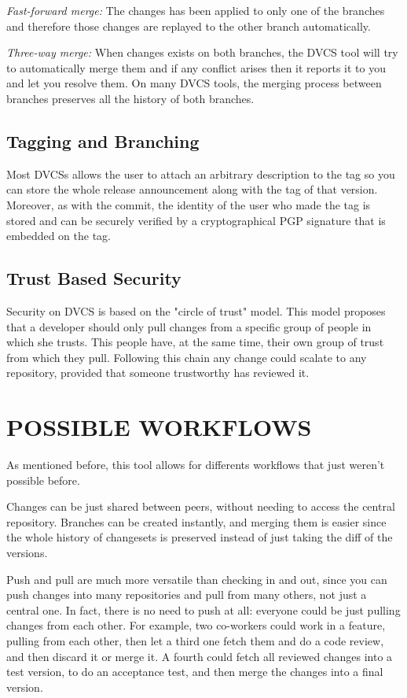 \documentclass[a4paper,10pt]{article}
\begin{document}
\emph{Fast-forward merge:} The changes has been applied to only one of the branches and therefore those changes are replayed to the other branch automatically.

\emph{Three-way merge:} When changes exists on both branches, the DVCS tool will try to automatically merge them and if any conflict arises then it reports it to you and let you resolve them. 
On many DVCS tools, the merging process\cite{svnmerging} between branches preserves all the history of 
both branches.

\subsection{Tagging and Branching}
Most DVCSs allows the user to attach an arbitrary description to the tag so you can store the whole release announcement along with the tag of that version. Moreover, as with the commit, the identity of the user who made the tag is stored and can be securely verified by a cryptographical PGP signature that is embedded on the tag.

\subsection{Trust Based Security}
Security on DVCS is based on the "circle of trust" model. This model proposes that a developer should only pull changes from a specific group of people
in which she trusts. This people have, at the same time, their own group of trust from which they pull. Following this chain any change could scalate
to any repository, provided that someone trustworthy has reviewed it.




\section{POSSIBLE WORKFLOWS}
\label{WORKFLOWS}

As mentioned before, this tool allows for differents workflows that just weren't 
possible before.

Changes can be just shared between peers, without needing to access the central 
repository. Branches can be created instantly, and merging them is easier since 
the whole history of changesets is preserved instead of just taking the diff of 
the versions.

Push and pull are much more versatile than checking in and out, since you can push 
changes into many repositories and pull from many others, not just a central one.
In fact, there is no need to push at all:
everyone could be just pulling changes from each other. For example, two co-workers could work 
in a feature, pulling from each other, then let a third one fetch them and do a code review, and then 
discard it or merge it. A fourth could fetch all reviewed changes into a test version, to do an 
acceptance test, and then merge the changes into a final version.
\end{document}
